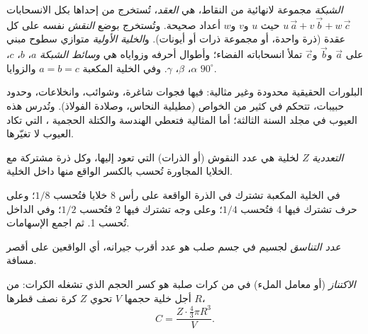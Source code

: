 \begin{definition}\label{def:b1:crystals-metals:lattice}
\emph{الشبكة} مجموعة لانهائية من النقاط، هي
\emph{العقد}، تُستخرج من إحداها بكل
الانسحابات $u\,\vec a + v\,\vec b + w\,\vec c$ حيث $u$ و$v$
و$w$ أعداد صحيحة. وتُستخرج  بوضع
\emph{النقش} نفسه على كل عقدة (ذرة واحدة، أو مجموعة ذرات أو أيونات).
و\emph{الخلية الأولية} متوازي سطوح مبني على
$\vec a$ و$\vec b$ و$\vec c$ تملأ انسحاباته الفضاء؛ وأطوال أحرفه
وزواياه هي \emph{وسائط الشبكة}
$a$، $b$، $c$، $\alpha$، $\beta$، $\gamma$. وفي الخلية المكعبة
$a = b = c$ والزوايا $90^\circ$.
\end{definition}

\begin{remark}\label{rem:b1:crystals-metals:real}
البلورات الحقيقية محدودة وغير مثالية: فيها فجوات شاغرة،
وشوائب، وانخلاعات، وحدود حبيبات، تتحكم في كثير من
الخواص (مطيلية النحاس، وصلادة الفولاذ). وتُدرس هذه
العيوب في مجلد السنة الثالثة؛ أما  المثالية فتعطي
الهندسة والكتلة الحجمية ، التي تكاد العيوب لا تغيّرها.
\end{remark}

\begin{definition}\label{def:b1:crystals-metals:multiplicity}
\emph{التعددية} $Z$ لخلية هي عدد
النقوش (أو الذرات) التي تعود إليها، وكل ذرة مشتركة مع
الخلايا المجاورة تُحسب بالكسر الواقع منها داخل الخلية.
\end{definition}

\begin{method}\label{met:b1:crystals-metals:count}
في الخلية المكعبة تشترك في الذرة الواقعة على رأس 8 خلايا فتُحسب
$1/8$؛ وعلى حرف تشترك فيها 4 فتُحسب $1/4$؛ وعلى وجه
تشترك فيها 2 فتُحسب $1/2$؛ وفي الداخل تُحسب 1. ثم اجمع الإسهامات.
\end{method}

\begin{definition}\label{def:b1:crystals-metals:coordination}
\emph{عدد التناسق} لجسيم
في جسم صلب هو عدد أقرب جيرانه، أي الواقعين على
أقصر مسافة.
\end{definition}

\begin{definition}[الاكتناز]\label{def:b1:crystals-metals:compactness}
\emph{الاكتناز} (أو معامل الملء) في
 من كرات صلبة هو كسر الحجم الذي تشغله
الكرات: من أجل خلية حجمها $V$ تحوي $Z$ كرة نصف قطرها $R$،
\[
  C = \frac{Z \cdot \frac43 \pi R^3}{V} .
\]
\end{definition}

